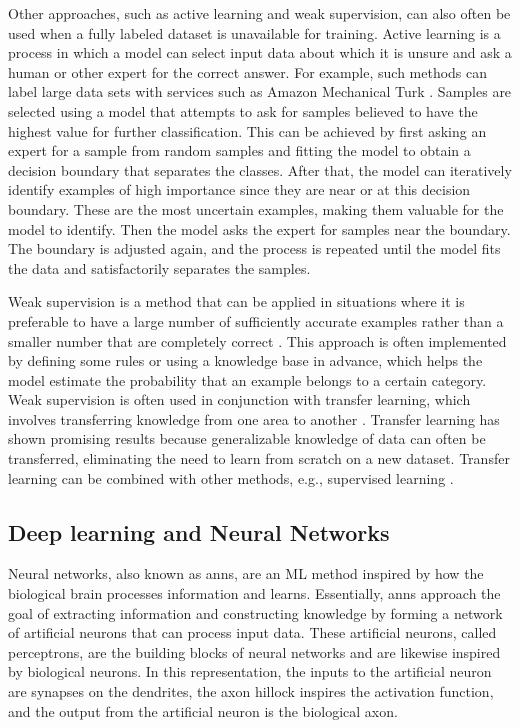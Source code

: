         Other approaches, such as active learning and weak supervision, can also often be used when a fully labeled dataset is unavailable for training. Active learning is a process in which a model can select input data about which it is unsure and ask a human or other expert for the correct answer. For example, such methods can label large data sets with services such as Amazon Mechanical Turk \cite{AmazonMechanicalTurk}. Samples are selected using a model that attempts to ask for samples believed to have the highest value for further classification. This can be achieved by first asking an expert for a sample from random samples and fitting the model to obtain a decision boundary that separates the classes. After that, the model can iteratively identify examples of high importance since they are near or at this decision boundary. These are the most uncertain examples, making them valuable for the model to identify. Then the model asks the expert for samples near the boundary. The boundary is adjusted again, and the process is repeated until the model fits the data and satisfactorily separates the samples.
        
        Weak supervision is a method that can be applied in situations where it is preferable to have a large number of sufficiently accurate examples rather than a smaller number that are completely correct \cite{hoffmannKnowledgeBasedWeakSupervision2011}. This approach is often implemented by defining some rules or using a knowledge base in advance, which helps the model estimate the probability that an example belongs to a certain category. Weak supervision is often used in conjunction with transfer learning, which involves transferring knowledge from one area to another \cite{wangSimVLMSimpleVisual2022}. Transfer learning has shown promising results because generalizable knowledge of data can often be transferred, eliminating the need to learn from scratch on a new dataset. Transfer learning can be combined with other methods, e.g., supervised learning \cite{zhuangComprehensiveSurveyTransfer2021}.
    
    \subsection{Deep learning and Neural Networks} \label{sec:2_background_theory_deep_learning_and_neural_networks}
    Neural networks, also known as \glspl{ann}, are an ML method inspired by how the biological brain processes information and learns. Essentially, \glspl{ann} approach the goal of extracting information and constructing knowledge by forming a network of artificial neurons that can process input data. These artificial neurons, called perceptrons, are the building blocks of neural networks and are likewise inspired by biological neurons. In this representation, the inputs to the artificial neuron are synapses on the dendrites, the axon hillock inspires the activation function, and the output from the artificial neuron is the biological axon.
    
